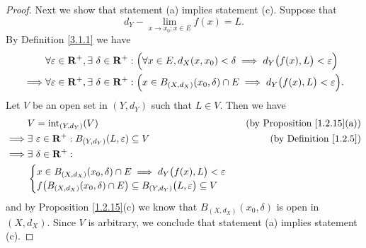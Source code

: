 \begin{proof}
    Next we show that statement (a) implies statement (c).
    Suppose that
    \[
        d_Y - \lim_{x \to x_0 ; x \in E} f(x) = L.
    \]
    By Definition \ref{3.1.1} we have
    \begin{align*}
                 & \forall \varepsilon \in \mathbf{R}^+, \exists\ \delta \in \mathbf{R}^+ : \Big(\forall x \in E, d_X(x, x_0) < \delta \implies d_Y\big(f(x), L\big) < \varepsilon\Big)   \\
        \implies & \forall \varepsilon \in \mathbf{R}^+, \exists\ \delta \in \mathbf{R}^+ : \Big(x \in B_{(X, d_X)}(x_0, \delta) \cap E \implies d_Y\big(f(x), L\big) < \varepsilon\Big).
    \end{align*}
    Let \(V\) be an open set in \((Y, d_Y)\) such that \(L \in V\).
    Then we have
    \begin{align*}
                 & V = \text{int}_{(Y, d_Y)}(V)                                                                           & \text{(by Proposition \ref{1.2.15}(a))} \\
        \implies & \exists\ \varepsilon \in \mathbf{R}^+ : B_{(Y, d_Y)}(L, \varepsilon) \subseteq V                               & \text{(by Definition \ref{1.2.5})}      \\
        \implies & \exists\ \delta \in \mathbf{R}^+ :                                                                                                                       \\
                 & \begin{cases}
                       x \in B_{(X, d_X)}(x_0, \delta) \cap E \implies d_Y\big(f(x), L\big) < \varepsilon \\
                       f\big(B_{(X, d_X)}(x_0, \delta) \cap E\big) \subseteq B_{(Y, d_Y)}\big(L, \varepsilon\big) \subseteq V
                   \end{cases}
    \end{align*}
    and by Proposition \ref{1.2.15}(c) we know that \(B_{(X, d_X)}(x_0, \delta)\) is open in \((X, d_X)\).
    Since \(V\) is arbitrary, we conclude that statement (a) implies statement (c).


\end{proof}
